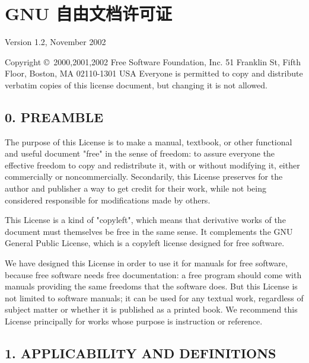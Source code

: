 \documentclass{book}
\begin{document}
\chapter*{GNU 自由文档许可证}
Version 1.2, November 2002

  Copyright \copyright\ 2000,2001,2002  Free Software Foundation, Inc.
  51 Franklin St, Fifth Floor, Boston, MA  02110-1301  USA
  Everyone is permitted to copy and distribute verbatim copies
  of this license document, but changing it is not allowed.

\setcounter{section}{-1}
\section*{0. PREAMBLE}

The purpose of this License is to make a manual, textbook, or other
functional and useful document "free" in the sense of freedom: to
assure everyone the effective freedom to copy and redistribute it,
with or without modifying it, either commercially or noncommercially.
Secondarily, this License preserves for the author and publisher a way
to get credit for their work, while not being considered responsible
for modifications made by others.

This License is a kind of "copyleft", which means that derivative
works of the document must themselves be free in the same sense. It
complements the GNU General Public License, which is a copyleft
license designed for free software.

We have designed this License in order to use it for manuals for free
software, because free software needs free documentation: a free
program should come with manuals providing the same freedoms that the
software does. But this License is not limited to software manuals; it
can be used for any textual work, regardless of subject matter or
whether it is published as a printed book. We recommend this License
principally for works whose purpose is instruction or reference.

\section*{1. APPLICABILITY AND DEFINITIONS}
\end{document}
